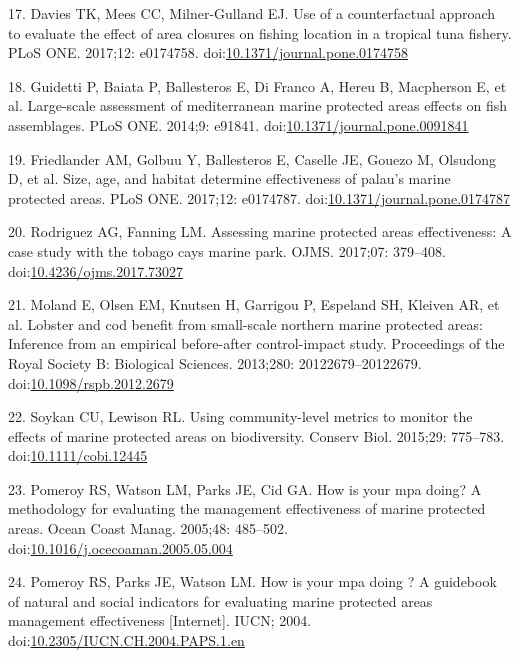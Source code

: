 \documentclass[12pt,]{article}
\begin{document}
\hypertarget{ref-davies_2017-ml}{}
17. Davies TK, Mees CC, Milner-Gulland EJ. Use of a counterfactual
approach to evaluate the effect of area closures on fishing location in
a tropical tuna fishery. PLoS ONE. 2017;12: e0174758.
doi:\href{https://doi.org/10.1371/journal.pone.0174758}{10.1371/journal.pone.0174758}

\hypertarget{ref-guidetti_2014-8Z}{}
18. Guidetti P, Baiata P, Ballesteros E, Di Franco A, Hereu B,
Macpherson E, et al. Large-scale assessment of mediterranean marine
protected areas effects on fish assemblages. PLoS ONE. 2014;9: e91841.
doi:\href{https://doi.org/10.1371/journal.pone.0091841}{10.1371/journal.pone.0091841}

\hypertarget{ref-friedlander_2017-oI}{}
19. Friedlander AM, Golbuu Y, Ballesteros E, Caselle JE, Gouezo M,
Olsudong D, et al. Size, age, and habitat determine effectiveness of
palau's marine protected areas. PLoS ONE. 2017;12: e0174787.
doi:\href{https://doi.org/10.1371/journal.pone.0174787}{10.1371/journal.pone.0174787}

\hypertarget{ref-rodriguez_2017-PD}{}
20. Rodriguez AG, Fanning LM. Assessing marine protected areas
effectiveness: A case study with the tobago cays marine park. OJMS.
2017;07: 379--408.
doi:\href{https://doi.org/10.4236/ojms.2017.73027}{10.4236/ojms.2017.73027}

\hypertarget{ref-moland_2013-VP}{}
21. Moland E, Olsen EM, Knutsen H, Garrigou P, Espeland SH, Kleiven AR,
et al. Lobster and cod benefit from small-scale northern marine
protected areas: Inference from an empirical before-after control-impact
study. Proceedings of the Royal Society B: Biological Sciences.
2013;280: 20122679--20122679.
doi:\href{https://doi.org/10.1098/rspb.2012.2679}{10.1098/rspb.2012.2679}

\hypertarget{ref-soykan_2015-nu}{}
22. Soykan CU, Lewison RL. Using community-level metrics to monitor the
effects of marine protected areas on biodiversity. Conserv Biol.
2015;29: 775--783.
doi:\href{https://doi.org/10.1111/cobi.12445}{10.1111/cobi.12445}

\hypertarget{ref-pomeroy_2005-Py}{}
23. Pomeroy RS, Watson LM, Parks JE, Cid GA. How is your mpa doing? A
methodology for evaluating the management effectiveness of marine
protected areas. Ocean Coast Manag. 2005;48: 485--502.
doi:\href{https://doi.org/10.1016/j.ocecoaman.2005.05.004}{10.1016/j.ocecoaman.2005.05.004}

\hypertarget{ref-pomeroy_2004-23}{}
24. Pomeroy RS, Parks JE, Watson LM. How is your mpa doing ? A guidebook
of natural and social indicators for evaluating marine protected areas
management effectiveness {[}Internet{]}. IUCN; 2004.
doi:\href{https://doi.org/10.2305/IUCN.CH.2004.PAPS.1.en}{10.2305/IUCN.CH.2004.PAPS.1.en}
\end{document}
